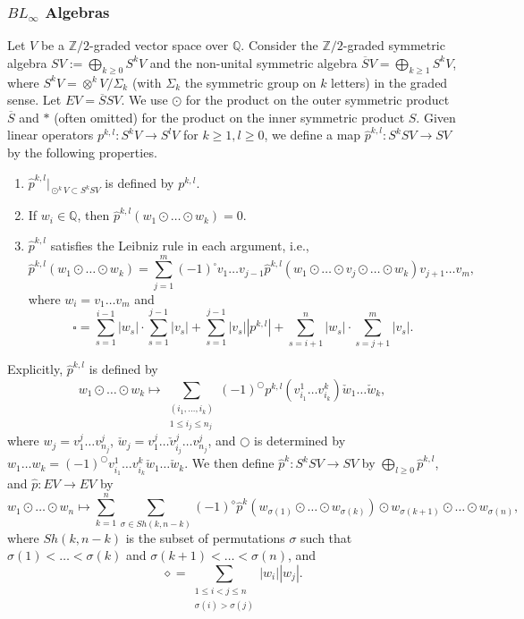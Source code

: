 \documentclass[11pt]{amsart}
\numberwithin{equation}{section}
\def\Z{{\mathbb Z}}
\def\Q{{\mathbb Q}}
\begin{document}
\subsubsection{$BL_\infty$ Algebras}\label{ss:BL}
Let $V$ be a $\Z/2$-graded vector space over $\Q$. Consider the $\Z/2$-graded symmetric algebra $S V:=\bigoplus_{k\ge 0} S^k V$ and the non-unital symmetric algebra $\overline{S} V =\bigoplus_{k\ge 1} S^k V$, where $S^kV=\otimes^k V/\Sigma_k$ (with $\Sigma_k$ the symmetric group on $k$ letters) in the graded sense. Let $EV=\overline{S}SV$. We use $\odot$ for the product on the outer symmetric product $\overline{S}$ and $\ast$ (often omitted) for the product on the inner symmetric product $S$. Given linear operators $p^{k,l}:S^kV \to S^l V$ for $k\ge 1, l\ge 0$, we define a map $\widehat{p}^{k,l}:S^k SV \to SV$ by the following properties.
\begin{enumerate}
	\item $\widehat{p}^{k,l}|_{\odot^k V\subset S^kSV}$ is defined by $p^{k,l}$.
	\item If $w_i\in \Q$, then $\widehat{p}^{k,l}(w_1\odot \ldots \odot w_k)=0$.
	\item $\widehat{p}^{k,l}$ satisfies the Leibniz rule in each argument, i.e., 
        \begin{equation}\label{eqn:pkl}
            \widehat{p}^{k,l}(w_1\odot \ldots \odot w_k)=\sum_{j=1}^m(-1)^{\square} v_1 \ldots  v_{j-1} \widehat{p}^{k,l}(w_1\odot \ldots \odot v_j \odot \ldots \odot w_k) v_{j+1} \ldots  v_m,
        \end{equation}
	where $w_i=v_1 \ldots  v_m$ and
 \begin{equation}\label{eqn:sign}
\square = \sum_{s=1}^{i-1}|w_s|\cdot \sum_{s=1}^{j-1}|v_s|+\sum_{s=1}^{j-1}|v_s||p^{k,l}|+\sum_{s=i+1}^n |w_s|\cdot \sum_{s=j+1}^{m}|v_s|.
 \end{equation}
\end{enumerate}
Explicitly, $\widehat{p}^{k,l}$ is defined by
\begin{equation}\label{eq:p_hat_1}
    w_1\odot \ldots \odot w_k \mapsto \sum_{\substack{(i_1,\ldots,i_k) \\ 1\le i_j\le n_j}} (-1)^{\bigcirc} p^{k,l}(v^1_{i_1}\ldots v^k_{i_k}) \check{w}_1 \ldots \check{w}_k,
\end{equation}
where $w_j=v^j_1 \ldots  v^j_{n_j}$, $\check{w}_j=v^j_1 \ldots  \check{v}^j_{i_j} \ldots  v^j_{n_j}$, and $\bigcirc$ is determined by $w_1 \ldots  w_k=(-1)^\bigcirc v^1_{i_1} \ldots  v^k_{i_k} \check{w}_1 \ldots \check{w}_k$. We then define $\widehat{p}^k:S^k S V \to S V$ by $\bigoplus_{l\ge 0} \widehat{p}^{k,l}$, and $\widehat{p}:EV \to EV$ by
\begin{equation}\label{eqn:q}
    w_1\odot \ldots \odot w_n \mapsto \sum_{k=1}^n\sum_{\sigma \in Sh(k,n-k)}(-1)^{\diamond} \widehat{p}^k(w_{\sigma(1)}\odot \ldots \odot w_{\sigma(k)})\odot w_{\sigma(k+1)}\odot \ldots \odot w_{\sigma(n)},
\end{equation}
where $Sh(k,n-k)$ is the subset of permutations $\sigma$ such that $\sigma(1)<\ldots<\sigma(k)$ and $\sigma(k+1)<\ldots < \sigma(n)$, and
$$\diamond=\sum_{\substack {1\le i < j \le n\\ \sigma(i)>\sigma(j)}}|w_i||w_j|.$$
\end{document}
